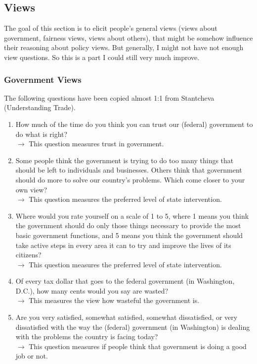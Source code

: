 \documentclass[12pt]{article}
\begin{document}
\subsection{Views}
The goal of this section is to elicit people's general views (views about government, fairness views, views about others), that might be somehow influence their reasoning about policy views. But generally, I might not have not enough view questions. So this is a part I could still very much improve.  
\subsubsection{Government Views}
The following questions have been copied almost 1:1 from Stantcheva (Understanding Trade).
\begin{enumerate}
    \item How much of the time do you think you can trust our (federal) government to do what is right? \\$\rightarrow$ This question measures trust in government. 
    \item Some people think the government is trying to do too many things that should be left to individuals and businesses. Others think that government should do more to solve our country’s problems. Which come closer to your own view?\\$\rightarrow$ This question measures the preferred level of state intervention. 
    \item Where would you rate yourself on a scale of 1 to 5, where 1 means you think the government should do only those things necessary to provide the most basic government functions, and 5 means you think the government should take active steps in every area it can to try and improve the lives of its citizens?\\$\rightarrow$ This question measures the preferred level of state intervention. 
    \item Of every tax dollar that goes to the federal government (in Washington, D.C.), how many cents would you say are wasted?\\$\rightarrow$ This measures the view how wasteful the government is.
    \item Are you very satisfied, somewhat satisfied, somewhat dissatisfied, or very dissatisfied with the way the (federal) government (in Washington) is dealing with the problems the country is facing today? \\ $\rightarrow$ This question measures if people think that government is doing a good job or not. 

\end{enumerate}
\end{document}
